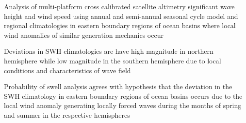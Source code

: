 \documentclass[draft,linenumbers]{agujournal2018}
\begin{document}



\begin{keypoints}
\item Analysis of multi-platform cross calibrated satellite altimetry significant wave height and wind speed using annual and semi-annual seasonal cycle model and regional climatologies in eastern boundary regions of ocean basins where local wind anomalies of similar generation mechanics occur
\item  Deviations in SWH climatologies are have high magnitude in northern hemisphere while low magnitude in the southern hemisphere due to local conditions and characteristics of wave field
\item Probability of swell analysis agrees with hypothesis that the deviation in the SWH climatology in eastern boundary regions of ocean basins occurs due to the local wind anomaly generating locally forced waves during the months of spring and summer in the respective hemispheres 
\end{keypoints}

%
%

\end{document}
